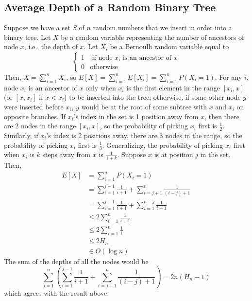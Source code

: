 \documentclass[12pt]{article}
\begin{document}
\subsection*{Average Depth of a Random Binary Tree}
Suppose we have a set $S$ of $n$ random numbers that we insert in order into a binary tree. Let $X$ be a random variable representing the number of ancestors of node $x$, i.e., the depth of $x$. Let $X_i$ be a Bernoulli random variable equal to
\[
  \begin{cases}
      1 & \text{ if node $x_i$ is an ancestor of $x$} \\
      0 & \text{otherwise}
   \end{cases}
\]
Then, $X = \sum_{i=1}^nX_i$, so $E[X] = \sum_{i=1}^nE[X_i] = \sum_{i=1}^nP(X_i=1)$. For any $i$, node $x_i$ is an ancestor of $x$ only when $x_i$ is the first element in the range $[x_i, x]$ (or $[x, x_i]$ if $x < x_i$) to be inserted into the tree; otherwise, if some other node $y$ were inserted before $x_i$, $y$ would be at the root of some subtree with $x$ and $x_i$ on opposite branches. If $x_i$'s index in the set is 1 position away from $x$, then there are 2 nodes in the range $[x_i, x]$, so the probability of picking $x_i$ first is $\frac{1}{2}$. Similarly, if $x_i$'s index is 2 positions away, there are 3 nodes in the range, so the probability of picking $x_i$ first is $\frac{1}{3}$. Generalizing, the probability of picking $x_i$ first when $x_i$ is $k$ steps away from $x$ is $\frac{1}{1+k}$. Suppose $x$ is at position $j$ in the set. Then,
\begin{align*}
  E[X] &= \sum_{i=1}^nP(X_i=1) \\
  & = \sum_{i=1}^{j-1} \frac{1}{i+1} + \sum_{i=j+1}^n \frac{1}{(i-j)+1} \\
  &= \sum_{i=1}^{j-1} \frac{1}{i+1} + \sum_{i=1}^{n-j} \frac{1}{i+1} \\
  &\leq 2\sum_{i=1}^{n} \frac{1}{i+1} \\
  &\leq 2\sum_{i=1}^{n} \frac{1}{i} \\
  &\leq 2H_n \\
  & \in O(\log n)
\end{align*}
The sum of the depths of all the nodes would be
\[ \sum_{j=1}^n \left( \sum_{i=1}^{j-1} \frac{1}{i+1} + \sum_{i=j+1}^n \frac{1}{(i-j)+1} \right) = 2n(H_n-1)\]
which agrees with the result above.
\end{document}
